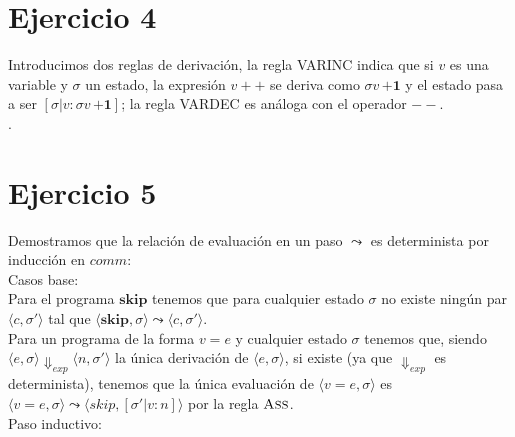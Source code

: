 \documentclass{article}
\begin{document}
\section{Ejercicio 4}

Introducimos dos reglas de derivación, la regla \textsc{V\footnotesize{AR}\normalsize{I}\footnotesize{NC}} indica que si $v$ es una variable y $\sigma$ un estado, la expresión $v{+}{+}$ se deriva como $\sigma v\,\textbf{+1}$ y el estado pasa a ser $[\sigma|v:\sigma v\,\textbf{+1}]$; la regla \textsc{V\footnotesize{AR}\normalsize{D}\footnotesize{EC}} es análoga con el operador ${-}{-}$.\\

.\\

\section{Ejercicio 5}

Demostramos que la relación de evaluación en un paso $\leadsto$ es determinista por inducción en $comm$:\\

\noindent Casos base:\\

\noindent Para el programa $\textbf{skip}$ tenemos que para cualquier estado $\sigma$ no existe ningún par $\langle c,\sigma '\rangle$ tal que $\langle\textbf{skip},\sigma\rangle\leadsto\langle c,\sigma '\rangle$.\\

\noindent Para un programa de la forma $v=e$ y cualquier estado $\sigma$ tenemos que, siendo $\langle e,\sigma\rangle\Downarrow_{exp}\langle n,\sigma '\rangle$ la única derivación de $\langle e,\sigma\rangle$, si existe (ya que $\Downarrow_{exp}$ es determinista), tenemos que la única evaluación de $\langle v=e,\sigma\rangle$ es $\langle v=e,\sigma\rangle\leadsto\langle skip,[\sigma'|v:n]\rangle$ por la regla $\textsc{A\footnotesize{SS}}$.\\

\noindent Paso inductivo:\\
\end{document}
